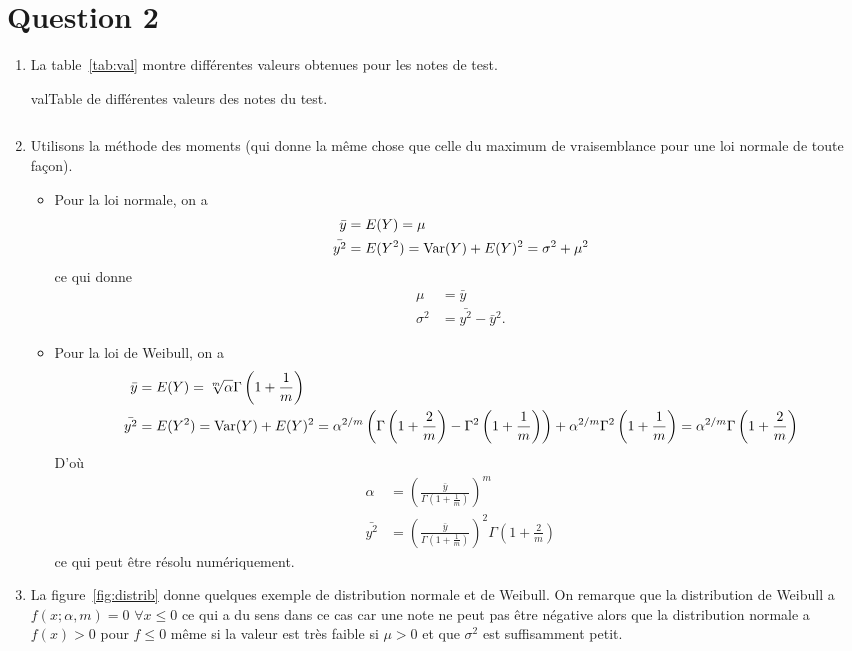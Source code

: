 \section{Question 2}
\begin{enumerate}
  \item La table~\ref{tab:val} montre différentes valeurs obtenues pour les notes de test.
    \begin{mytable}{val}{Table de différentes valeurs des notes du test.}
      \begin{tabular}{ll}
        
      \end{tabular}
    \end{mytable}
  \item Utilisons la méthode des moments
    (qui donne la même chose que celle du maximum de vraisemblance pour
    une loi normale de toute façon).
    \begin{itemize}
      \item
        Pour la loi normale, on a
        \begin{align*}
          \bar{y} & = E(Y)
                    = \mu\\
          \bar{y^2} & = E(Y^2)
                      = \operatorname{Var}(Y) + E(Y)^2
                      = \sigma^2 + \mu^2
        \end{align*}
        ce qui donne
        \begin{align*}
          \mu & = \bar{y}\\
          \sigma^2 & = \bar{y^2} - \bar{y}^2.
        \end{align*}
      \item
        Pour la loi de Weibull, on a
        \begin{align*}
          \bar{y} & = E(Y)
                   = \sqrt[m]{\alpha}\Gamma\left(1 + \frac{1}{m}\right)\\
          \bar{y^2} & = E(Y^2)
                     = \operatorname{Var}(Y) + E(Y)^2
                     = \alpha^{2/m}\left(\Gamma\left(1 + \frac{2}{m}\right) -
                    \Gamma^2\left(1 + \frac{1}{m}\right)\right) + \alpha^{2/m}\Gamma^2\left(1 + \frac{1}{m}\right)
                     = \alpha^{2/m}\Gamma\left(1 + \frac{2}{m}\right)
        \end{align*}
        D'où
        \begin{align*}
          \alpha & = \left(\frac{\bar{y}}{\Gamma\left(1 + \frac{1}{m}\right)}\right)^m\\
          \bar{y^2} & = \left(\frac{\bar{y}}{\Gamma\left(1 + \frac{1}{m}\right)}\right)^2\Gamma\left(1 + \frac{2}{m}\right)
        \end{align*}
        ce qui peut être résolu numériquement.
    \end{itemize}
  \item
    La figure~\ref{fig:distrib} donne quelques exemple de distribution normale et de Weibull.
    On remarque que la distribution de Weibull a $f(x; \alpha, m) = 0$ $\forall x \leq 0$
    ce qui a du sens dans ce cas car une note ne peut pas être négative alors que
    la distribution normale a $f(x) > 0$ pour $f \leq 0$ même si la valeur est très faible
    si $\mu > 0$ et que $\sigma^2$ est suffisamment petit.


\end{enumerate}
